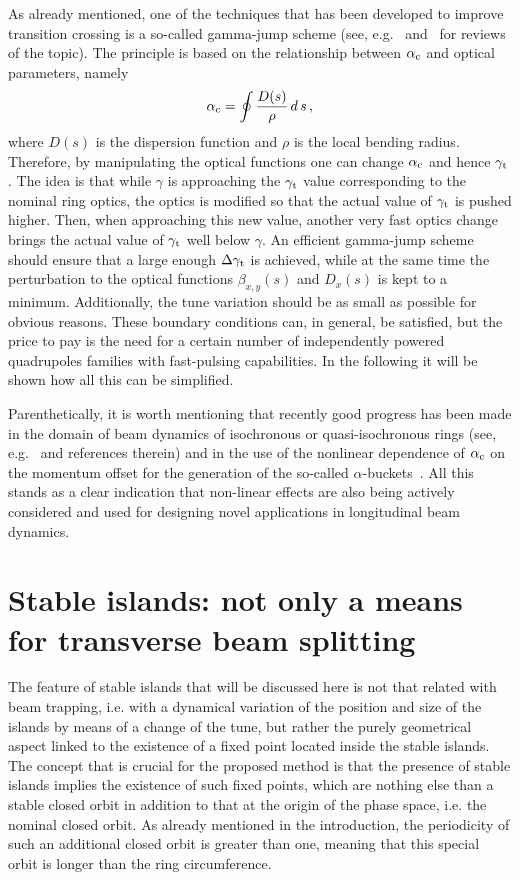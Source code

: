 \documentclass{article}
\begin{document}
As already mentioned, one of the techniques that has been developed to improve transition crossing is a so-called gamma-jump scheme (see, e.g.~\cite{gj1,gj2,gj3} and~\cite{gamjump} for reviews of the topic). The principle is based on the relationship between $\alpha_{\rm c}$ and optical parameters, namely
%
\begin{equation}
\alpha_{\rm c} = \oint \frac{D(s)}{\rho} \, d\, s \, ,
\end{equation}
%
where $D(s)$ is the dispersion function and $\rho$ is the local bending radius. Therefore, by manipulating the optical functions one can change $\alpha_{\rm c}$ and hence $\gamma_{\rm t}$. The idea is that while $\gamma$ is approaching the $\gamma_{\rm t}$ value corresponding to the nominal ring optics, the optics is modified so that the actual value of $\gamma_{\rm t}$ is pushed higher. Then, when approaching this new value, another very fast optics change brings the actual value of $\gamma_{\rm t}$ well below $\gamma$. An efficient gamma-jump scheme should ensure that a large enough $\Delta \gamma_{\rm t}$ is achieved, while at the same time the perturbation to the optical functions $\beta_{x,y}(s)$ and $D_{x}(s)$ is kept to a minimum. Additionally, the tune variation should be as small as possible for obvious reasons. These boundary conditions can, in general, be satisfied, but the price to pay is the need for a certain number of independently powered quadrupoles families with fast-pulsing capabilities. In the following it will be shown how all this can be simplified.

Parenthetically, it is worth mentioning that recently good progress has been made in the domain of beam dynamics of isochronous or quasi-isochronous rings (see, e.g.~\cite{iso1,iso2,iso3,iso4,iso5,iso6,iso7,iso8} and references therein) and in the use of the nonlinear dependence of $\alpha_{\rm c}$ on the momentum offset for the generation of the so-called $\alpha$-buckets~\cite{alpha1,alpha2,alpha3,alpha4,alpha5}. All this stands as a clear indication that non-linear effects are also being actively considered and used for designing novel applications in longitudinal beam dynamics.
%
\section{Stable islands: not only a means for transverse beam splitting}\label{sec:splitting}
%
The feature of stable islands that will be discussed here is not that related with beam trapping, i.e. with a dynamical variation of the position and size of the islands by means of a change of the tune, but rather the purely geometrical aspect linked to the existence of a fixed point located inside the stable islands. The concept that is crucial for the proposed method is that the presence of stable islands implies the existence of such fixed points, which are nothing else than a stable closed orbit in addition to that at the origin of the phase space, i.e. the nominal closed orbit. As already mentioned in the introduction, the periodicity of such an additional closed orbit is greater than one, meaning that this special orbit is longer than the ring circumference. 
\end{document}
